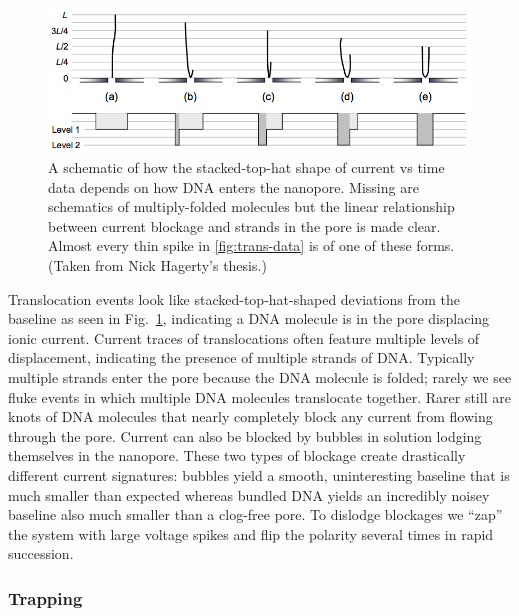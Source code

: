 \documentclass[aps,prl,preprint,groupedaddress]{revtex4}
\begin{document}
\begin{figure}
\centering
\includegraphics[width=1\textwidth]{figures/dna-approach}
\caption{A schematic of how the stacked-top-hat shape of current vs time data depends on how DNA enters the nanopore. Missing are schematics of multiply-folded molecules but the linear relationship between current blockage and strands in the pore is made clear. Almost every thin spike in \ref{fig:trans-data} is of one of these forms. (Taken from Nick Hagerty's thesis.)}
\label{fig:dna-approach}
\end{figure}

Translocation events look like stacked-top-hat-shaped deviations from the baseline as seen in Fig.~\ref{fig:dna-approach}, indicating a DNA molecule is in the pore displacing ionic current.
Current traces of translocations often feature multiple levels of displacement, indicating the presence of multiple strands of DNA.
Typically multiple strands enter the pore because the DNA molecule is folded; rarely we see fluke events in which multiple DNA molecules translocate together.
Rarer still are knots of DNA molecules that nearly completely block any current from flowing through the pore.
Current can also be blocked by bubbles in solution lodging themselves in the nanopore.
These two types of blockage create drastically different current signatures: bubbles yield a smooth, uninteresting baseline that is much smaller than expected whereas bundled DNA yields an incredibly noisey baseline also much smaller than a clog-free pore.
To dislodge blockages we ``zap'' the system with large voltage spikes and flip the polarity several times in rapid succession.

\subsubsection{Trapping}
\end{document}
